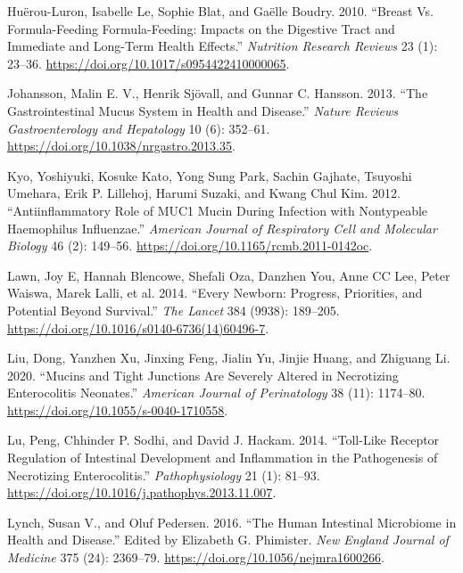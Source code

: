 \documentclass[
]{article}
\newlength{\cslhangindent}
\newlength{\cslentryspacingunit} %
\newenvironment{CSLReferences}[2] %
 {%
  \setlength{\parindent}{0pt}
  \ifodd #1
  \let\oldpar\par
  \def\par{\hangindent=\cslhangindent\oldpar}
  \fi
  \setlength{\parskip}{#2\cslentryspacingunit}
 }%
 {}
\begin{document}
\begin{CSLReferences}{1}{0}
\leavevmode{}%
Huërou-Luron, Isabelle Le, Sophie Blat, and Gaëlle Boudry. 2010. {``Breast Vs. Formula-Feeding Formula-Feeding: Impacts on the Digestive Tract and Immediate and Long-Term Health Effects.''} \emph{Nutrition Research Reviews} 23 (1): 23--36. \url{https://doi.org/10.1017/s0954422410000065}.

\leavevmode{}%
Johansson, Malin E. V., Henrik Sjövall, and Gunnar C. Hansson. 2013. {``The Gastrointestinal Mucus System in Health and Disease.''} \emph{Nature Reviews Gastroenterology and Hepatology} 10 (6): 352--61. \url{https://doi.org/10.1038/nrgastro.2013.35}.

\leavevmode{}%
Kyo, Yoshiyuki, Kosuke Kato, Yong Sung Park, Sachin Gajhate, Tsuyoshi Umehara, Erik P. Lillehoj, Harumi Suzaki, and Kwang Chul Kim. 2012. {``Antiinflammatory Role of {MUC}1 Mucin During Infection with Nontypeable Haemophilus Influenzae.''} \emph{American Journal of Respiratory Cell and Molecular Biology} 46 (2): 149--56. \url{https://doi.org/10.1165/rcmb.2011-0142oc}.

\leavevmode{}%
Lawn, Joy E, Hannah Blencowe, Shefali Oza, Danzhen You, Anne CC Lee, Peter Waiswa, Marek Lalli, et al. 2014. {``Every Newborn: Progress, Priorities, and Potential Beyond Survival.''} \emph{The Lancet} 384 (9938): 189--205. \url{https://doi.org/10.1016/s0140-6736(14)60496-7}.

\leavevmode{}%
Liu, Dong, Yanzhen Xu, Jinxing Feng, Jialin Yu, Jinjie Huang, and Zhiguang Li. 2020. {``Mucins and Tight Junctions Are Severely Altered in Necrotizing Enterocolitis Neonates.''} \emph{American Journal of Perinatology} 38 (11): 1174--80. \url{https://doi.org/10.1055/s-0040-1710558}.

\leavevmode{}%
Lu, Peng, Chhinder P. Sodhi, and David J. Hackam. 2014. {``Toll-Like Receptor Regulation of Intestinal Development and Inflammation in the Pathogenesis of Necrotizing Enterocolitis.''} \emph{Pathophysiology} 21 (1): 81--93. \url{https://doi.org/10.1016/j.pathophys.2013.11.007}.

\leavevmode{}%
Lynch, Susan V., and Oluf Pedersen. 2016. {``The Human Intestinal Microbiome in Health and Disease.''} Edited by Elizabeth G. Phimister. \emph{New England Journal of Medicine} 375 (24): 2369--79. \url{https://doi.org/10.1056/nejmra1600266}.


\end{CSLReferences}
\end{document}
